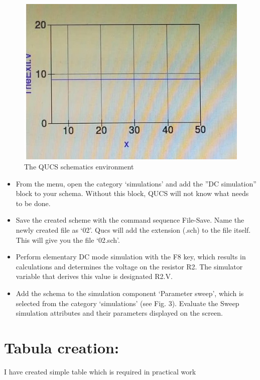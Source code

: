 \documentclass{report}
\begin{document}
\begin{figure}[t]
\includegraphics{Figures/figure_2_.jpg}
\caption{The QUCS schematics environment}
\label{fig:figure2}
\end{figure}
\begin{itemize}
\item From the menu, open the category ‘simulations’ and add the ”DC simulation” block to
your schema. Without this block, QUCS will not know what needs to be done.
\item Save the created scheme with the command sequence File-Save. Name the newly created
file as ‘02’. Qucs will add the extension (.sch) to the file itself. This will give you the
file ‘02.sch’.

\item Perform elementary DC mode simulation with the F8 key, which results in calculations
and determines the voltage on the resistor R2. The simulator variable that derives this
value is designated R2.V.
\item Add the schema to the simulation component ‘Parameter sweep’, which is selected from
the category ‘simulations’ (see Fig. 3). Evaluate the Sweep simulation attributes and
their parameters displayed on the screen. \cite{firstRef,thirdRef}






 \end{itemize}
 
 \section{Tabula creation:}
 I have created simple table which is required in practical work \cite{firstRef}
\end{document}
